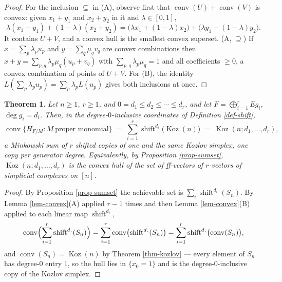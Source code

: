 \documentclass[11pt, a4paper, abstract=yes]{scrartcl}
\theoremstyle{definition}
\theoremstyle{remark}
\theoremstyle{plain}
\newtheorem{theorem}[definition]{Theorem}
\newcommand{\Koz}{\operatorname{Koz}}
\newcommand{\shift}{\operatorname{shift}}
\newcommand{\conv}{\operatorname{conv}}
\begin{document}
\begin{proof}
For the inclusion \(\subseteq\) in (A), observe first that \(\conv(U)+\conv(V)\) is convex: given
\(x_1+y_1\) and \(x_2+y_2\) in it and \(\lambda\in[0,1]\),
\begin{equation}\label{eq:convex}
  \lambda(x_1+y_1)+(1-\lambda)(x_2+y_2)
  =\bigl(\lambda x_1+(1-\lambda)x_2\bigr)+\bigl(\lambda y_1+(1-\lambda)y_2\bigr).
\end{equation}
It contains \(U+V\), and a convex hull is the smallest convex superset. (A, \(\supseteq\)) If \(x=\sum_p\lambda_pu_p\) and \(y=\sum_q\mu_qv_q\) are convex
combinations then \(x+y=\sum_{p,q}\lambda_p\mu_q(u_p+v_q)\) with \(\sum_{p,q}\lambda_p\mu_q=1\) and
all coefficients \(\ge0\), a convex combination of points of \(U+V\).
For (B), the identity \(L(\sum_p\lambda_pu_p)=\sum_p\lambda_pL(u_p)\) gives both inclusions at
once.
\end{proof}

\begin{theorem}
Let \(n\ge1\), \(r\ge1\), and \(0=d_1\le d_2\le\cdots\le d_r\), and let
\(F=\bigoplus_{i=1}^rEg_i\), \(\deg g_i=d_i\). Then, in the degree-\(0\)-inclusive coordinates of
Definition \ref{def-shift},
\begin{equation}\label{eq:main}
  \conv\bigl\lbrace H_{F/M}: M\ \text{proper monomial}\bigr\rbrace
  \;=\;\sum_{i=1}^{r}\shift^{d_i}\bigl(\Koz(n)\bigr)\;=\;\Koz(n;d_1,\dots,d_r),
\end{equation}
a Minkowski sum of \(r\) shifted copies of one and the same Kozlov simplex, one copy per generator
degree. Equivalently, by Proposition \ref{prop-sumset}, \(\Koz(n;d_1,\dots,d_r)\) is the convex hull of
the set of \emph{ff}-vectors of \(r\)-vectors of simplicial complexes on \([n]\).
\label{thm:main}
\label{thm-main}
\end{theorem}

\begin{proof}
By Proposition \ref{prop-sumset} the achievable set is \(\sum_i\shift^{d_i}(S_n)\). By
Lemma \ref{lem-convex}(A) applied \(r-1\) times and then Lemma \ref{lem-convex}(B) applied to each linear map
\(\shift^{d_i}\),
\begin{equation}\label{eq:main-2}
  \conv\Bigl(\sum_{i=1}^r\shift^{d_i}(S_n)\Bigr)
  =\sum_{i=1}^r\conv\bigl(\shift^{d_i}(S_n)\bigr)
  =\sum_{i=1}^r\shift^{d_i}\bigl(\conv(S_n)\bigr),
\end{equation}
and \(\conv(S_n)=\Koz(n)\) by Theorem \ref{thm-kozlov} --- every element of \(S_n\) has degree-\(0\)
entry \(1\), so the hull lies in \(\lbrace x_0=1\rbrace\) and is the degree-\(0\)-inclusive copy of
the Kozlov simplex.
\end{proof}
\end{document}
